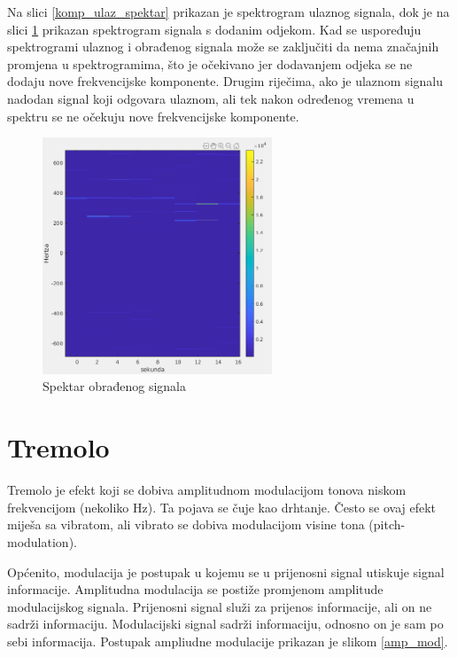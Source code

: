 \documentclass[conference]{IEEEtran}
\begin{document}
Na slici \ref{komp_ulaz_spektar} prikazan je spektrogram ulaznog signala, dok je na slici \ref{echo} prikazan spektrogram
signala s dodanim odjekom. Kad se uspoređuju spektrogrami ulaznog i obrađenog signala može se zaključiti da nema
značajnih promjena u spektrogramima, što je očekivano jer dodavanjem odjeka se ne dodaju nove frekvencijske komponente.
Drugim riječima, ako je ulaznom signalu nadodan signal koji odgovara ulaznom, ali tek nakon određenog vremena u spektru
se ne očekuju nove frekvencijske komponente.



\begin{figure}[H]
  \centerline{\includegraphics[height=200pt]{slike/echo.png}}
  \caption{Spektar obrađenog signala}
  \label{echo}
\end{figure}

\section{Tremolo}
Tremolo je efekt koji se dobiva amplitudnom modulacijom tonova niskom frekvencijom (nekoliko Hz). Ta pojava se čuje
kao drhtanje. Često se ovaj efekt miješa sa vibratom, ali vibrato se dobiva modulacijom visine tona (pitch-modulation).

Općenito, modulacija je postupak u kojemu se u prijenosni signal utiskuje signal informacije. Amplitudna modulacija
se postiže promjenom amplitude modulacijskog signala. Prijenosni signal služi za prijenos informacije, ali on ne
sadrži informaciju. Modulacijski signal sadrži informaciju, odnosno on je sam po sebi informacija. Postupak ampliudne
 modulacije prikazan je slikom \ref{amp_mod}.
\end{document}
